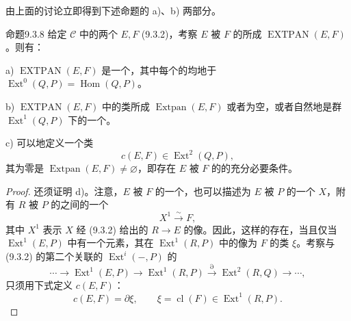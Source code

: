 由上面的讨论立即得到下述命题的 a)、b) 两部分。
\begin{SGAresult}{命题}{9.3.8}
给定 $\mathcal C$ 中的两个 $E,F$ (9.3.2)，考察 $E$ 被 $F$ 的所成 $\operatorname{EXTPAN}(E,F)$。则有：

 a) $\operatorname{EXTPAN}(E,F)$ 是一个，其中每个的均地于 $\operatorname{Ext}^0(Q,P)=\operatorname{Hom}(Q,P)$。

 b) $\operatorname{EXTPAN}(E,F)$ 中的类所成 $\operatorname{Extpan}(E,F)$ 或者为空，或者自然地是群 $\operatorname{Ext}^1(Q,P)$ 下的一个。

 c) 可以地定义一个类
\begin{equation}\tag{9.3.9}
 c(E,F)\in\operatorname{Ext}^2(Q,P),
\end{equation}
其为零是 $\operatorname{Extpan}(E,F)\ne\varnothing$，即存在 $E$ 被 $F$ 的的充分必要条件。
\end{SGAresult}

\begin{proof}
还须证明 d)。注意，$E$ 被 $F$ 的一个，也可以描述为 $E$ 被 $P$ 的一个 $X$，附有 $R$ 被 $P$ 的之间的一个
\[
 X^1\xrightarrow{\sim}F,
\]
其中 $X^1$ 表示 $X$ 经 (9.3.2) 给出的 $R\to E$ 的像。因此，这样的存在，当且仅当 $\operatorname{Ext}^1(E,P)$ 中有一个元素，其在 $\operatorname{Ext}^1(R,P)$ 中的像为 $F$ 的类 $\xi$。考察与 (9.3.2) 的第二个关联的 $\operatorname{Ext}^i(-,P)$ 的
\[
 \cdots\longrightarrow\operatorname{Ext}^1(E,P)\longrightarrow
 \operatorname{Ext}^1(R,P)\xrightarrow{\partial}\operatorname{Ext}^2(R,Q)\longrightarrow\cdots,
\]
只须用下式定义 $c(E,F)$：
\begin{equation}\tag{9.3.10}
 c(E,F)=\partial\xi,\qquad \xi=\operatorname{cl}(F)\in\operatorname{Ext}^1(R,P).
\end{equation}
\end{proof}

